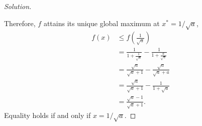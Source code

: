 \begin{proof}[Solution]
\begin{marginfigure}
    \centering
    
    \caption[A unique maximum from a derivative sign change.]{%
      The case $a=4$. The function increases up
      to $x^*=1/2$ and decreases afterward. Its maximum is $1/3$.
      The sign argument in the proof applies to every $a>1$.}
    \label{fig:hw07:rational-maximum}
  \end{marginfigure}
  Therefore, $f$ attains its unique global maximum at
  $x^*=1/\sqrt a$,
  \[
    \begin{aligned}
      f(x)&\le f\left(\frac1{\sqrt a}\right)\\[6pt]
        &=\frac1{1+\frac1{\sqrt a}}-
          \frac1{1+\frac{a}{\sqrt a}}\\[6pt]
        &=\frac{\sqrt a}{\sqrt a+1}-
          \frac{\sqrt a}{\sqrt a+a}\\[6pt]
        &=\frac{\sqrt a}{\sqrt a+1}-\frac1{1+\sqrt a}\\[6pt]
        &=\frac{\sqrt a-1}{\sqrt a+1}.
    \end{aligned}
  \]
  Equality holds if and only if $x=1/\sqrt a$.
\end{proof}
